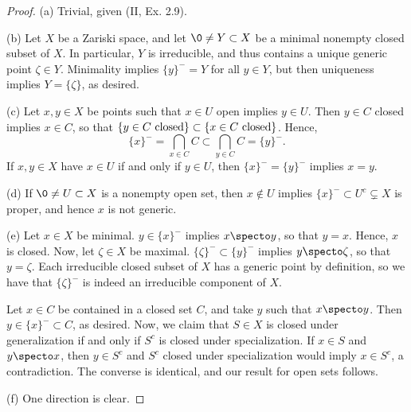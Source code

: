 \documentclass[12pt]{amsart}
\begin{document}
\begin{proof}
  (a) Trivial, given (II, Ex. 2.9).

  (b) Let $X$ be a Zariski space, and let $\0\neq Y\subset X$ be a minimal nonempty closed subset of $X$.
  In particular, $Y$ is irreducible, and thus contains a unique generic point $\zeta\in Y$.
  Minimality implies $\{y\}^-= Y$ for all $y\in Y$, but then uniqueness implies $Y=\{\zeta\}$, as desired.

  (c) Let $x,y\in X$ be points such that $x\in U$ open implies $y\in U$.
  Then $y\in C$ closed implies $x\in C$, so that $\{y\in C\textup{ closed}\}\subset \{x\in C\textup{ closed}\}$.
  Hence,
  \[
    \{x\}^-=\bigcap_{x\in C}C\subset \bigcap_{y\in C}C = \{y\}^-.
  \] 
  If $x,y\in X$ have $x\in U$ if and only if $y\in U$, then $\{x\}^-=\{y\}^-$ implies $x=y$.

  (d) If $\0\neq U\subset X$ is a nonempty open set, then $x\notin U$ implies $\{x\}^-\subset U^c\subsetneq X$ is proper, and hence $x$ is not generic.

  (e) Let $x\in X$ be minimal.
  $y\in \{x\}^-$ implies $x\specto y$, so that $y=x$.
  Hence, $x$ is closed.
  Now, let $\zeta\in X$ be maximal.
  $\{\zeta\}^-\subset \{y\}^-$ implies $y\specto \zeta$, so that $y=\zeta$.
  Each irreducible closed subset of $X$ has a generic point by definition, so we have that $\{\zeta\}^-$ is indeed an irreducible component of $X$.

  Let $x\in C$ be contained in a closed set $C$, and take $y$ such that $x\specto y$.
  Then $y\in \{x\}^-\subset C$, as desired.
  Now, we claim that $S\in X$ is closed under generalization if and only if $S^c$ is closed under specialization.
  If $x\in S$ and $y\specto x$, then $y\in S^c$ and $S^c$ closed under specialization would imply $x\in S^c$, a contradiction.
  The converse is identical, and our result for open sets follows.

  (f) One direction is clear.
\end{proof}
\end{document}
